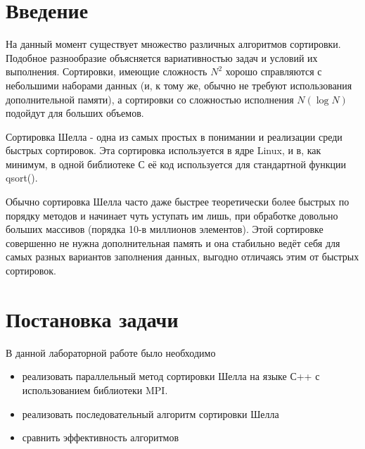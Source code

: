 \documentclass[12pt, letterpaper]{report}
\newcommand{\anonchapter}[1]{\chapter*{#1}\addcontentsline{toc}{chapter}{#1}}
\begin{document}
	\setcounter{page}{2}
	
	\tableofcontents
	\newpage
	

\anonchapter{Введение}
На данный момент существует множество различных алгоритмов сортировки.
Подобное разнообразие объясняется вариативностью задач и условий их выполнения.
Сортировки, имеющие сложность \(N^2\)
 хорошо справляются с небольшими наборами
данных (и, к тому же, обычно не требуют использования дополнительной памяти), а
сортировки со сложностью исполнения \(N(\log N)\) подойдут для больших объемов.

Сортировка Шелла - одна из самых простых в понимании и реализации среди быстрых
сортировок. Эта сортировка используется в ядре Linux, и в, как минимум, в одной библиотеке
С её код используется для стандартной функции qsort().

Обычно сортировка Шелла часто даже быстрее теоретически более быстрых по порядку
методов и начинает чуть уступать им лишь, при обработке довольно больших массивов
(порядка 10-в миллионов элементов). Этой сортировке совершенно не нужна дополнительная
память и она стабильно ведёт себя для самых разных вариантов заполнения данных, выгодно
отличаясь этим от быстрых сортировок.

\chapter*{Постановка задачи}
В данной лабораторной работе было необходимо
\begin{itemize}
\item реализовать параллельный метод сортировки Шелла на языке С++ с
использованием библиотеки MPI.
\item реализовать последовательный алгоритм сортировки Шелла
\item сравнить эффективность алгоритмов
\end{itemize}
\end{document}
